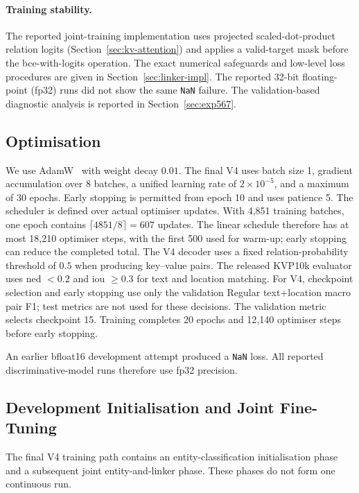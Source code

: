\paragraph{Training stability.}
The reported joint-training implementation uses projected scaled-dot-product
relation logits (Section~\ref{sec:kv-attention}) and applies a valid-target
mask before the \gls{bce}-with-logits operation. The exact numerical
safeguards and low-level loss procedures are given in
Section~\ref{sec:linker-impl}. The reported 32-bit floating-point (fp32) runs
did not show the same \texttt{NaN} failure. The validation-based diagnostic
analysis is reported in Section~\ref{sec:exp567}.

\subsection{Optimisation}
\label{sec:optimisation}

We use AdamW~\cite{loshchilov2019decoupled} with weight decay $0.01$.
The final V4 uses batch size 1, gradient accumulation over 8 batches, a unified
learning rate of $2\times10^{-5}$, and a maximum of 30 epochs. Early stopping
is permitted from epoch 10 and uses patience 5. The scheduler is defined over
actual optimiser updates. With 4{,}851 training batches, one epoch contains
$\lceil4851/8\rceil=607$ updates. The linear schedule therefore has at most
18{,}210 optimiser steps, with the first 500 used for warm-up; early stopping
can reduce the completed total. The V4 decoder uses a fixed
relation-probability threshold of $0.5$ when producing key--value pairs. The
released KVP10k evaluator uses \gls{ned} $<0.2$ and \gls{iou} $\geq0.3$ for
text and location matching. For V4, checkpoint selection and early stopping
use only the validation Regular text+location macro pair F1; test metrics are
not used for these decisions. The validation metric selects checkpoint 15.
Training completes 20 epochs and 12{,}140 optimiser steps before early stopping.

An earlier bfloat16 development attempt produced a \texttt{NaN} loss. All
reported discriminative-model runs therefore use fp32 precision.

\subsection{Development Initialisation and Joint Fine-Tuning}
\label{sec:two-phase}

The final V4 training path contains an entity-classification initialisation phase
and a subsequent joint entity-and-linker phase. These phases do not form one
continuous run.

